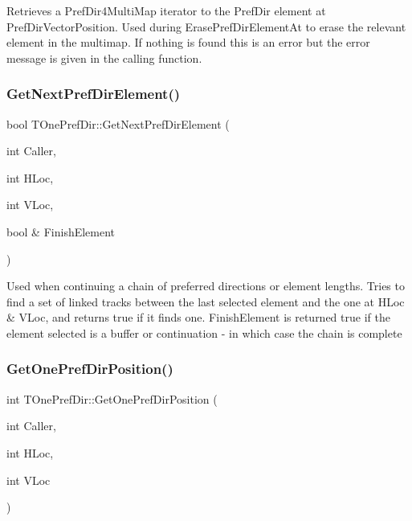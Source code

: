 Retrieves a Pref\+Dir4\+Multi\+Map iterator to the Pref\+Dir element at Pref\+Dir\+Vector\+Position. Used during Erase\+Pref\+Dir\+Element\+At to erase the relevant element in the multimap. If nothing is found this is an error but the error message is given in the calling function. \mbox{\label{class_t_one_pref_dir_a06cd3491535362fccbba4e76b9a120e9}} 
\subsubsection{\texorpdfstring{Get\+Next\+Pref\+Dir\+Element()}{GetNextPrefDirElement()}}
{\footnotesize\ttfamily bool T\+One\+Pref\+Dir\+::\+Get\+Next\+Pref\+Dir\+Element (\begin{DoxyParamCaption}\item[{int}]{Caller,  }\item[{int}]{H\+Loc,  }\item[{int}]{V\+Loc,  }\item[{bool \&}]{Finish\+Element }\end{DoxyParamCaption})}

Used when continuing a chain of preferred directions or element lengths. Tries to find a set of linked tracks between the last selected element and the one at H\+Loc \& V\+Loc, and returns true if it finds one. Finish\+Element is returned true if the element selected is a buffer or continuation -\/ in which case the chain is complete \mbox{\label{class_t_one_pref_dir_a200fd1dc1cffc400160b8d2147278752}} 
\subsubsection{\texorpdfstring{Get\+One\+Pref\+Dir\+Position()}{GetOnePrefDirPosition()}}
{\footnotesize\ttfamily int T\+One\+Pref\+Dir\+::\+Get\+One\+Pref\+Dir\+Position (\begin{DoxyParamCaption}\item[{int}]{Caller,  }\item[{int}]{H\+Loc,  }\item[{int}]{V\+Loc }\end{DoxyParamCaption})\hspace{0.3cm}{\ttfamily [private]}}

